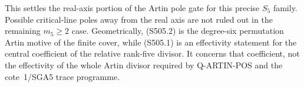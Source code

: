 This settles the real-axis portion of the
Artin pole gate for this precise $S_5$
family. Possible critical-line poles away
from the real axis are not ruled out in
the remaining $m_5\ge2$ case. Geometrically,
(S505.2) is the degree-six permutation
Artin motive of the finite cover, while
(S505.1) is an effectivity statement for
the central coefficient of the relative
rank-five divisor. It concerns that
coefficient, not the effectivity of the
whole Artin divisor required by
Q-ARTIN-POS and the cote~1/SGA5 trace programme.
